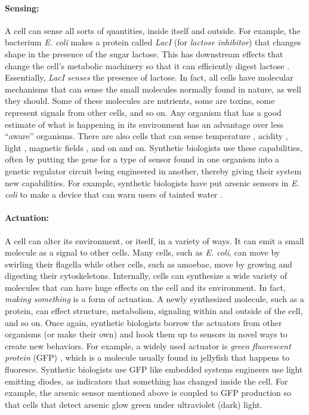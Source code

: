 \paragraph{Sensing:} A cell can sense all sorts of quantities, inside
itself and outside. For example, the bacterium {\em E. coli} makes a
protein called {\em LacI} (for {\em lactose inhibitor}) that changes
shape in the presence of the sugar lactose. This has downstream
effects that change the cell's metabolic machinery so that it can
efficiently digest lactose \cite{lac-operon}. Essentially, {\em LacI}
{\em senses} the presence of lactose. In fact, all cells have
molecular mechanisms that can sense the small molecules normally found
in nature, as well they should. Some of these molecules are nutrients,
some are toxins, some represent signals from other cells, and so
on. Any organism that has a good estimate of what is happening in its
environment has an advantage over less ``aware'' organisms. There are
also cells that can sense temperature \cite{heat-shock}, acidity
\cite{ph-sensor}, light \cite{light-sensor}, magnetic fields
\cite{magnetosome}, and on and on. Synthetic biologists use these
capabilities, often by putting the gene for a type of sensor found in
one organism into a genetic regulator circuit being engineered in
another, thereby giving their system new capabilities. For example,
synthetic biologists have put arsenic sensors in {\em E. coli} to make
a device that can warn users of tainted water \cite{arsenic-sensor}.

%
%

%
%
\paragraph{Actuation:} A cell can alter its environment, or itself, in
a variety of ways. It can emit a small molecule as a signal to other
cells. Many cells, such as {\em E. coli}, can move by swirling their
flagella while other cells, such as amoebae, move by growing and
digesting their cytoskeletons. Internally, cells can synthesize a wide
variety of molecules that can have huge effects on the cell and its
environment. In fact, {\em making something} is a form of actuation. A
newly synthesized molecule, such as a protein, can effect structure,
metabolism, signaling within and outside of the cell, and so on. Once
again, synthetic biologists borrow the actuators from other organisms
(or make their own) and hook them up to sensors in novel ways to
create new behaviors. For example, a widely used actuator is {\em
  green fluorescent protein} (GFP) \cite{gfp}, which is a molecule
usually found in jellyfish that happens to fluoresce. Synthetic
biologists use GFP like embedded systems engineers use light emitting
diodes, as indicators that something has changed inside the cell. For
example, the arsenic sensor mentioned above is coupled to GFP
production so that cells that detect arsenic glow green under
ultraviolet (dark) light.

